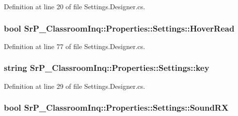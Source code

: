 \-Definition at line 20 of file \-Settings.\-Designer.\-cs.

\hypertarget{class_sr_p___classroom_inq_1_1_properties_1_1_settings_a9e2211fd7a7199dbfaa600115f7a2184}{
\subsubsection[{\-Hover\-Read}]{\setlength{\rightskip}{0pt plus 5cm}bool \-Sr\-P\-\_\-\-Classroom\-Inq\-::\-Properties\-::\-Settings\-::\-Hover\-Read}}
\label{class_sr_p___classroom_inq_1_1_properties_1_1_settings_a9e2211fd7a7199dbfaa600115f7a2184}


\-Definition at line 77 of file \-Settings.\-Designer.\-cs.

\hypertarget{class_sr_p___classroom_inq_1_1_properties_1_1_settings_adcf8c99db5c2978cebd00b77880dc4f9}{
\subsubsection[{key}]{\setlength{\rightskip}{0pt plus 5cm}string \-Sr\-P\-\_\-\-Classroom\-Inq\-::\-Properties\-::\-Settings\-::key}}
\label{class_sr_p___classroom_inq_1_1_properties_1_1_settings_adcf8c99db5c2978cebd00b77880dc4f9}


\-Definition at line 29 of file \-Settings.\-Designer.\-cs.

\hypertarget{class_sr_p___classroom_inq_1_1_properties_1_1_settings_ab0ec9af30232e0f23083548e3b7242a2}{
\subsubsection[{\-Sound\-R\-X}]{\setlength{\rightskip}{0pt plus 5cm}bool \-Sr\-P\-\_\-\-Classroom\-Inq\-::\-Properties\-::\-Settings\-::\-Sound\-R\-X}}
\label{class_sr_p___classroom_inq_1_1_properties_1_1_settings_ab0ec9af30232e0f23083548e3b7242a2}


